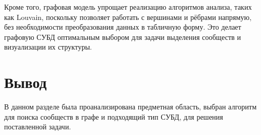 Кроме того, графовая модель упрощает реализацию алгоритмов анализа, таких как Louvain, поскольку позволяет работать с вершинами и рёбрами напрямую, без необходимости преобразования данных в табличную форму. Это делает графовую СУБД оптимальным выбором для задачи выделения сообществ и визуализации их структуры.


\section*{Вывод}

В данном разделе была проанализирована предметная область, выбран алгоритм для поиска сообществ в графе и подходящий тип СУБД, для решения поставленной задачи.
